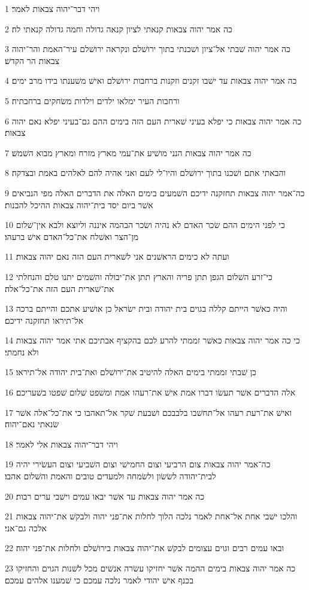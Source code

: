 \par 1 ויהי דבר־יהוה צבאות לאמר׃
\par 2 כה אמר יהוה צבאות קנאתי לציון קנאה גדולה וחמה גדולה קנאתי לה׃
\par 3 כה אמר יהוה שׁבתי אל־ציון ושׁכנתי בתוך ירושׁלם ונקראה ירושׁלם עיר־האמת והר־יהוה צבאות הר הקדשׁ׃
\par 4 כה אמר יהוה צבאות עד ישׁבו זקנים וזקנות ברחבות ירושׁלם ואישׁ משׁענתו בידו מרב ימים׃
\par 5 ורחבות העיר ימלאו ילדים וילדות משׂחקים ברחבתיה׃
\par 6 כה אמר יהוה צבאות כי יפלא בעיני שׁארית העם הזה בימים ההם גם־בעיני יפלא נאם יהוה צבאות׃
\par 7 כה אמר יהוה צבאות הנני מושׁיע את־עמי מארץ מזרח ומארץ מבוא השׁמשׁ׃
\par 8 והבאתי אתם ושׁכנו בתוך ירושׁלם והיו־לי לעם ואני אהיה להם לאלהים באמת ובצדקה׃
\par 9 כה־אמר יהוה צבאות תחזקנה ידיכם השׁמעים בימים האלה את הדברים האלה מפי הנביאים אשׁר ביום יסד בית־יהוה צבאות ההיכל להבנות׃
\par 10 כי לפני הימים ההם שׂכר האדם לא נהיה ושׂכר הבהמה איננה וליוצא ולבא אין־שׁלום מן־הצר ואשׁלח את־כל־האדם אישׁ ברעהו׃
\par 11 ועתה לא כימים הראשׁנים אני לשׁארית העם הזה נאם יהוה צבאות׃
\par 12 כי־זרע השׁלום הגפן תתן פריה והארץ תתן את־יבולה והשׁמים יתנו טלם והנחלתי את־שׁארית העם הזה את־כל־אלה׃
\par 13 והיה כאשׁר הייתם קללה בגוים בית יהודה ובית ישׂראל כן אושׁיע אתכם והייתם ברכה אל־תיראו תחזקנה ידיכם׃
\par 14 כי כה אמר יהוה צבאות כאשׁר זממתי להרע לכם בהקציף אבתיכם אתי אמר יהוה צבאות ולא נחמתי׃
\par 15 כן שׁבתי זממתי בימים האלה להיטיב את־ירושׁלם ואת־בית יהודה אל־תיראו׃
\par 16 אלה הדברים אשׁר תעשׂו דברו אמת אישׁ את־רעהו אמת ומשׁפט שׁלום שׁפטו בשׁעריכם׃
\par 17 ואישׁ את־רעת רעהו אל־תחשׁבו בלבבכם ושׁבעת שׁקר אל־תאהבו כי את־כל־אלה אשׁר שׂנאתי נאם־יהוה׃
\par 18 ויהי דבר־יהוה צבאות אלי לאמר׃
\par 19 כה־אמר יהוה צבאות צום הרביעי וצום החמישׁי וצום השׁביעי וצום העשׂירי יהיה לבית־יהודה לשׂשׂון ולשׂמחה ולמעדים טובים והאמת והשׁלום אהבו׃
\par 20 כה אמר יהוה צבאות עד אשׁר יבאו עמים וישׁבי ערים רבות׃
\par 21 והלכו ישׁבי אחת אל־אחת לאמר נלכה הלוך לחלות את־פני יהוה ולבקשׁ את־יהוה צבאות אלכה גם־אני׃
\par 22 ובאו עמים רבים וגוים עצומים לבקשׁ את־יהוה צבאות בירושׁלם ולחלות את־פני יהוה׃
\par 23 כה אמר יהוה צבאות בימים ההמה אשׁר יחזיקו עשׂרה אנשׁים מכל לשׁנות הגוים והחזיקו בכנף אישׁ יהודי לאמר נלכה עמכם כי שׁמענו אלהים עמכם׃

